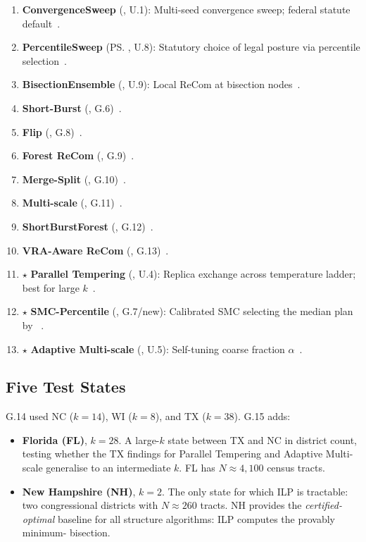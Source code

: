 \begin{enumerate}
  \item \textbf{ConvergenceSweep} (\cs{}, U.1): Multi-seed convergence
        sweep; federal statute default~\citep{dellaLibera2026convSweep}.
  \item \textbf{PercentileSweep} (\ps{}, U.8): Statutory choice of legal
        posture via percentile
        selection~\citep{dellaLibera2026percentileSweep}.
  \item \textbf{BisectionEnsemble} (\be{}, U.9): Local ReCom at bisection
        nodes~\citep{dellaLibera2026bisectionEns}.
  \item \textbf{Short-Burst} (\sburst{}, G.6)~\citep{dellaLibera2026shortburst}.
  \item \textbf{Flip} (\flip{}, G.8)~\citep{dellaLibera2026flip}.
  \item \textbf{Forest ReCom} (\fr{}, G.9)~\citep{dellaLibera2026forestRecom}.
  \item \textbf{Merge-Split} (\msp{}, G.10)~\citep{dellaLibera2026mergeSplit}.
  \item \textbf{Multi-scale} (\ms{}, G.11)~\citep{dellaLibera2026multiscale}.
  \item \textbf{ShortBurstForest} (\sburstf{}, G.12)~\citep{dellaLibera2026shortburstChains}.
  \item \textbf{VRA-Aware ReCom} (\vra{}, G.13)~\citep{dellaLibera2026vraAware}.
  \item $\star$ \textbf{Parallel Tempering} (\pt{}, U.4): Replica exchange
        across temperature ladder; best \ec{} for large
        $k$~\citep{dellaLibera2026pt}.
  \item $\star$ \textbf{SMC-Percentile} (\smcp{}, G.7/new): Calibrated SMC
        selecting the median plan by \pp{}~\citep{dellaLibera2026smcPercentile}.
  \item $\star$ \textbf{Adaptive Multi-scale} (\ams{}, U.5): Self-tuning
        coarse fraction $\alpha$~\citep{dellaLibera2026adaptiveMS}.
\end{enumerate}

\subsection{Five Test States}

G.14 used NC ($k = 14$), WI ($k = 8$), and TX ($k = 38$).
G.15 adds:

\begin{itemize}
  \item \textbf{Florida (FL)}, $k = 28$.
        A large-$k$ state between TX and NC in district count, testing
        whether the TX findings for Parallel Tempering and Adaptive Multi-scale
        generalise to an intermediate $k$.
        FL has $N \approx 4{,}100$ census tracts.

  \item \textbf{New Hampshire (NH)}, $k = 2$.
        The only state for which ILP is tractable: two congressional districts
        with $N \approx 260$ tracts.
        NH provides the \textit{certified-optimal} baseline for all structure
        algorithms: ILP computes the provably minimum-\ec{} bisection.
\end{itemize}

